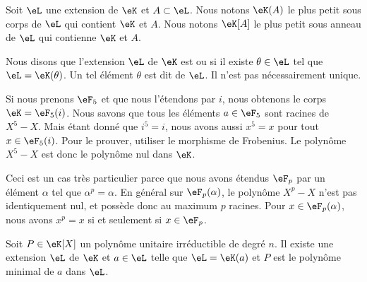 Soit \( \eL\) une extension de \( \eK\) et \( A\subset \eL\). Nous notons \( \eK(A)\) le plus petit sous corps de \( \eL\) qui contient \( \eK\) et \( A\). Nous notons \( \eK[A]\) le plus petit sous anneau de \( \eL\) qui contienne \( \eK\) et \( A\).

Nous disons que l'extension \( \eL\) de \( \eK\) est  ou  si il existe \( \theta\in\eL\) tel que \( \eL=\eK(\theta)\). Un tel élément \( \theta\) est dit  de \( \eL\). Il n'est pas nécessairement unique.


\begin{example} \label{ExLQhLhJ}
    Si nous prenons \( \eF_5\) et que nous l'étendons par \( i\), nous obtenons le corps \( \eK=\eF_5(i)\). Nous savons que tous les éléments \( a\in \eF_5\) sont racines de \( X^5-X\). Mais étant donné que \( i^5=i\), nous avons aussi \( x^5=x\) pour tout \( x\in \eF_5(i)\). Pour le prouver, utiliser le morphisme de Frobenius. Le polynôme \( X^5-X\) est donc le polynôme nul dans \( \eK\).

    Ceci est un cas très particulier parce que nous avons étendus \( \eF_p\) par un élément \( \alpha\) tel que \( \alpha^p=\alpha\). En général sur \( \eF_p(\alpha)\), le polynôme \( X^p-X\) n'est pas identiquement nul, et possède donc au maximum \( p\) racines. Pour \( x\in \eF_p(\alpha)\), nous avons \( x^p=x\) si et seulement si \( x\in \eF_p\).
\end{example}

\begin{lemma}
    Soit \( P\in\eK[X]\) un polynôme unitaire irréductible de degré \( n\). Il existe une extension \( \eL\) de \( \eK\) et \( a\in \eL\) telle que \( \eL=\eK(a)\) et \( P\) est le polynôme minimal de \( a\) dans \( \eL\).
\end{lemma}

